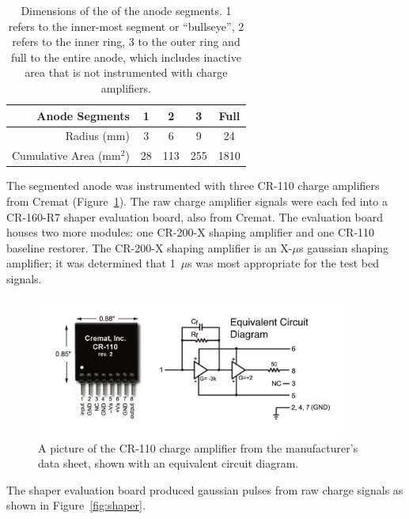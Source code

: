 \begin{table}[ht]
\centering
\begin{tabular}{rcccc}
\hline
 Anode Segments & 1 & 2 & 3 & Full \\
\hline
Radius (mm) & 3  & 6 & 9 & 24 \\
Cumulative Area (mm$^{2}$) & 28 &  113 & 255 & 1810 \\
\end{tabular}
\caption{Dimensions of the of the anode segments. 1 refers to the inner-most segment or ``bullseye'', 2 refers to the inner ring, 3 to the outer ring and full to the entire anode, which includes inactive area that is not instrumented with charge amplifiers.}
\label{T:anode_segs}
\end{table}

The segmented anode was instrumented with three CR-110 charge amplifiers from Cremat (Figure~\ref{fig:cr110}). The raw charge amplifier signals were each fed into a CR-160-R7 shaper evaluation board, also from Cremat. The evaluation board houses two more modules: one CR-200-X shaping amplifier and one CR-110 baseline restorer. The CR-200-X shaping amplifier is an X-$\mu$s gaussian shaping amplifier; it was determined that 1~$\mu$s was most appropriate for the test bed signals.

\begin{figure}[htbp]
\begin{center}
\includegraphics[width=4in]{figures/testbed/cr110.png}
\caption{A picture of the CR-110 charge amplifier from the manufacturer's data sheet, shown with an equivalent circuit diagram.}
\label{fig:cr110}
\end{center}
\end{figure}

The shaper evaluation board produced gaussian pulses from raw charge signals as shown in Figure~\ref{fig:shaper}.


